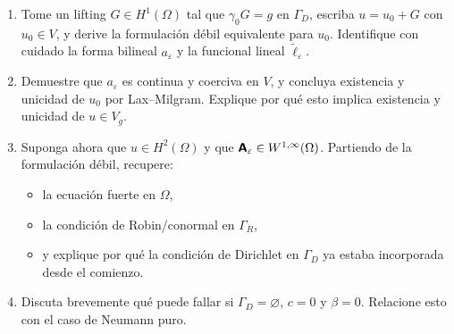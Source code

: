 \documentclass[11pt]{article}
\theoremstyle{thmstyle}
\def\mat   #1{\mbox{\boldmath $\mathsf #1$}}
\begin{document}
\begin{enumerate}[label=\textbf{\arabic*.}, leftmargin=*]
\begin{enumerate}[label=(\alph*)]
    \item Tome un lifting $G\in H^1(\Omega)$ tal que $\gamma_0G=g$ en $\Gamma_D$, escriba $u=u_0+G$ con $u_0\in V$, y derive la formulaci\'on d\'ebil equivalente para $u_0$. Identifique con cuidado la forma bilineal $a_\varepsilon$ y la funcional lineal $\widetilde \ell_\varepsilon$.

    \item Demuestre que $a_\varepsilon$ es continua y coerciva en $V$, y concluya existencia y unicidad de $u_0$ por Lax--Milgram. Explique por qu\'e esto implica existencia y unicidad de $u\in V_g$.

    \item Suponga ahora que $u\in H^2(\Omega)$ y que $\mat A_\varepsilon\in W^{1,\infty}(\Omega)$. Partiendo de la formulaci\'on d\'ebil, recupere:
    \begin{itemize}
        \item la ecuaci\'on fuerte en $\Omega$,
        \item la condici\'on de Robin/conormal en $\Gamma_R$,
        \item y explique por qu\'e la condici\'on de Dirichlet en $\Gamma_D$ ya estaba incorporada desde el comienzo.
    \end{itemize}

    \item Discuta brevemente qu\'e puede fallar si $\Gamma_D=\varnothing$, $c=0$ y $\beta=0$. Relacione esto con el caso de Neumann puro.
\end{enumerate}

\end{enumerate}
\end{document}
